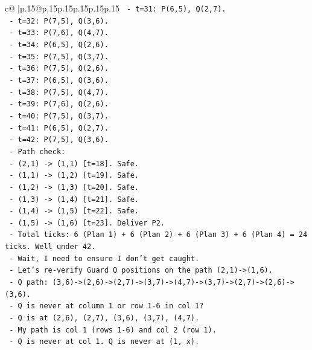 \documentclass{article}
\begin{document}
{\begin{supertabular}{c@{$\;$}|p{.15\linewidth}@{}p{.15\linewidth}p{.15\linewidth}p{.15\linewidth}p{.15\linewidth}p{.15\linewidth}}
{{{\texttt{      {-} t=31: P(6,5), Q(2,7).} \\
\texttt{      {-} t=32: P(7,5), Q(3,6).} \\
\texttt{      {-} t=33: P(7,6), Q(4,7).} \\
\texttt{      {-} t=34: P(6,5), Q(2,6).} \\
\texttt{      {-} t=35: P(7,5), Q(3,7).} \\
\texttt{      {-} t=36: P(7,5), Q(2,6).} \\
\texttt{      {-} t=37: P(6,5), Q(3,6).} \\
\texttt{      {-} t=38: P(7,5), Q(4,7).} \\
\texttt{      {-} t=39: P(7,6), Q(2,6).} \\
\texttt{      {-} t=40: P(7,5), Q(3,7).} \\
\texttt{      {-} t=41: P(6,5), Q(2,7).} \\
\texttt{      {-} t=42: P(7,5), Q(3,6).} \\
\texttt{    {-} Path check:} \\
\texttt{      {-} (2,1) {-}> (1,1) {[}t=18{]}. Safe.} \\
\texttt{      {-} (1,1) {-}> (1,2) {[}t=19{]}. Safe.} \\
\texttt{      {-} (1,2) {-}> (1,3) {[}t=20{]}. Safe.} \\
\texttt{      {-} (1,3) {-}> (1,4) {[}t=21{]}. Safe.} \\
\texttt{      {-} (1,4) {-}> (1,5) {[}t=22{]}. Safe.} \\
\texttt{      {-} (1,5) {-}> (1,6) {[}t=23{]}. Deliver P2.} \\
\texttt{    {-} Total ticks: 6 (Plan 1) + 6 (Plan 2) + 6 (Plan 3) + 6 (Plan 4) = 24 ticks. Well under 42.} \\
\texttt{    {-} Wait, I need to ensure I don't get caught.} \\
\texttt{    {-} Let's re{-}verify Guard Q positions on the path (2,1){-}>(1,6).} \\
\texttt{    {-} Q path: (3,6){-}>(2,6){-}>(2,7){-}>(3,7){-}>(4,7){-}>(3,7){-}>(2,7){-}>(2,6){-}>(3,6).} \\
\texttt{    {-} Q is never at column 1 or row 1{-}6 in col 1?} \\
\texttt{    {-} Q is at (2,6), (2,7), (3,6), (3,7), (4,7).} \\
\texttt{    {-} My path is col 1 (rows 1{-}6) and col 2 (row 1).} \\
\texttt{    {-} Q is never at col 1. Q is never at (1, x).} \\
}}}
\end{supertabular}}
\end{document}
